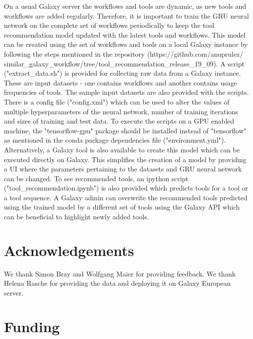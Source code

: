 \documentclass{bioinfo}
\begin{document}
On a usual Galaxy server the workflows and tools are dynamic, as new tools and workflows are added regularly. Therefore, it is important to train the GRU neural network on the complete set of workflows periodically to keep the tool recommendation model updated with the latest tools and workflows. This model can be created using the set of workflows and tools on a local Galaxy instance by following the steps mentioned in the repository (https://github.com/anuprulez/
similar\_galaxy\_workflow/tree/tool\_recommendation\_release\_19\_09). A script ("extract\_data.sh") is provided for collecting raw data from a Galaxy instance. These are input datasets - one contains workflows and another contains usage frequencies of tools. The sample input datasets are also provided with the scripts. There is a config file ("config.xml") which can be used to alter the values of multiple hyperparameters of the neural network, number of training iterations and sizes of training and test data. To execute the scripts on a GPU enabled machine, the "tensorflow-gpu" package should be installed instead of "tensorflow" as mentioned in the conda package dependencies file ("environment.yml"). Alternatively, a Galaxy tool is also available to create this model which can be executed directly on Galaxy. This simplifies the creation of a model by providing a UI where the parameters pertaining to the datasets and GRU neural network can be changed. To see recommended tools, an ipython script ("tool\_recommendation.ipynb") is also provided which predicts tools for a tool or a tool sequence. A Galaxy admin can overwrite the recommended tools predicted using the trained model by a different set of tools using the Galaxy API which can be beneficial to highlight newly added tools.

\section{Acknowledgements}
We thank Simon Bray and Wolfgang Maier for providing feedback. We thank Helena Rasche for providing the data and deploying it on Galaxy European server.

\section{Funding}
\end{document}
